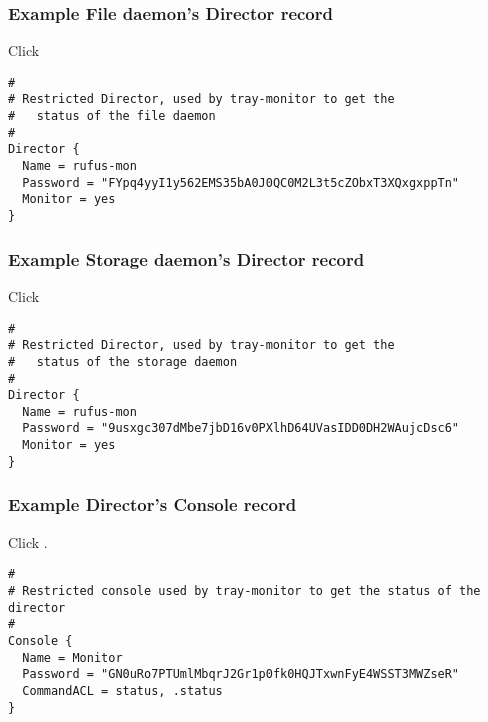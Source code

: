 \subsubsection*{Example File daemon's Director record}

Click


\footnotesize
\begin{verbatim}
#
# Restricted Director, used by tray-monitor to get the
#   status of the file daemon
#
Director {
  Name = rufus-mon
  Password = "FYpq4yyI1y562EMS35bA0J0QC0M2L3t5cZObxT3XQxgxppTn"
  Monitor = yes
}
\end{verbatim}
\normalsize

\subsubsection*{Example Storage daemon's Director record}

Click

\footnotesize
\begin{verbatim}
#
# Restricted Director, used by tray-monitor to get the
#   status of the storage daemon
#
Director {
  Name = rufus-mon
  Password = "9usxgc307dMbe7jbD16v0PXlhD64UVasIDD0DH2WAujcDsc6"
  Monitor = yes
}
\end{verbatim}
\normalsize

\subsubsection*{Example Director's Console record}

Click
.

\footnotesize
\begin{verbatim}
#
# Restricted console used by tray-monitor to get the status of the director
#
Console {
  Name = Monitor
  Password = "GN0uRo7PTUmlMbqrJ2Gr1p0fk0HQJTxwnFyE4WSST3MWZseR"
  CommandACL = status, .status
}
\end{verbatim}
\normalsize
